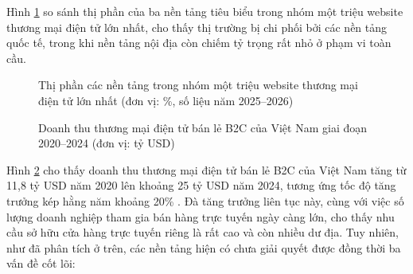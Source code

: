 \documentclass[../main.tex]{subfiles}
\begin{document}
Hình \ref{fig:market_share} so sánh thị phần của ba nền tảng tiêu biểu trong nhóm một triệu website thương mại điện tử lớn nhất, cho thấy thị trường bị chi phối bởi các nền tảng quốc tế, trong khi nền tảng nội địa còn chiếm tỷ trọng rất nhỏ ở phạm vi toàn cầu.

\begin{figure}[H]
\centering
{}
\caption{Thị phần các nền tảng trong nhóm một triệu website thương mại điện tử lớn nhất (đơn vị: \%, số liệu năm 2025--2026) \cite{builtwith2026, redstag_shopify2026, mobiloud2026}}
\label{fig:market_share}
\end{figure}

\begin{figure}[H]
\centering
{}
\caption{Doanh thu thương mại điện tử bán lẻ B2C của Việt Nam giai đoạn 2020--2024 (đơn vị: tỷ USD) \cite{idea_whitebook, vecom2025}}
\label{fig:tmdt_growth}
\end{figure}

Hình \ref{fig:tmdt_growth} cho thấy doanh thu thương mại điện tử bán lẻ B2C của Việt Nam tăng từ 11,8 tỷ USD năm 2020 lên khoảng 25 tỷ USD năm 2024, tương ứng tốc độ tăng trưởng kép hằng năm khoảng 20\% \cite{idea_whitebook, vecom2025}. Đà tăng trưởng liên tục này, cùng với việc số lượng doanh nghiệp tham gia bán hàng trực tuyến ngày càng lớn, cho thấy nhu cầu sở hữu cửa hàng trực tuyến riêng là rất cao và còn nhiều dư địa. Tuy nhiên, như đã phân tích ở trên, các nền tảng hiện có chưa giải quyết được đồng thời ba vấn đề cốt lõi:
\end{document}
